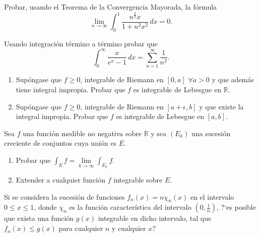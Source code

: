 \documentclass{book}
\newcommand{\rr}{\mathbb{R}}
\begin{document}
	
	\begin{ejer}{}
	Probar, usando el Teorema de la Convergencia Mayorada, la fórmula
  $$\lim\limits_{n\rightarrow \infty} \int_0^1 \frac{n^{\frac{3}{2}} x}{1+n^2 x^2}\,dx=0. $$
	\end{ejer}


  \begin{ejer}{}
	Usando integración término a término probar que 
  $$\int_0^{\infty} \frac{x}{e^x-1}\,dx=\sum_{n=1}^{\infty}\frac{1}{n^2}. $$
  \end{ejer}
	
	\begin{ejer}{}
	\begin{enumerate}
	\item Sup\'ongase que $f\geq 0$, integrable de Riemann en $[0,a]$ $\forall a>0$ y que adem\'as tiene integral impropia. 
	Probar que $f$ es integrable de Lebesgue en $\rr$.
	\item Sup\'ongase que $f\geq 0$, integrable de Riemann en $[a+\epsilon,b]$ y que existe la integral impropia.
	Probar que $f$ es integrable de Lebesgue en $[a,b]$.
	\end{enumerate}
	\end{ejer}
	
  \begin{ejer} Sea $f$ una función medible no negativa sobre $\rr$ y sea $(E_k)$ una sucesión creciente de conjuntos
  cuya unión es $E$.
	\begin{enumerate}
  \item Probar que $\int_{E} f=\lim\limits_{k \rightarrow \infty} \int_{E_k} f$.
  \item Extender a cualquier función $f$ integrable sobre $E$.
	\end{enumerate}
	\end{ejer}

  

  \begin{ejer} {}
	Si se considera la sucesión de funciones $f_n(x)=n \chi_n(x)$ en el intervalo $0\leq x\leq 1$,
  donde $\chi_n$ es la función característica del intervalo $\left(0,\frac{1}{n}\right)$, ?`es posible que exista
  una función $g(x)$ integrable en dicho intervalo, tal que $f_n(x) \leq g(x)$ para cualquier $n$ y cualquier
  $x$?
	\end{ejer}
\end{document}

